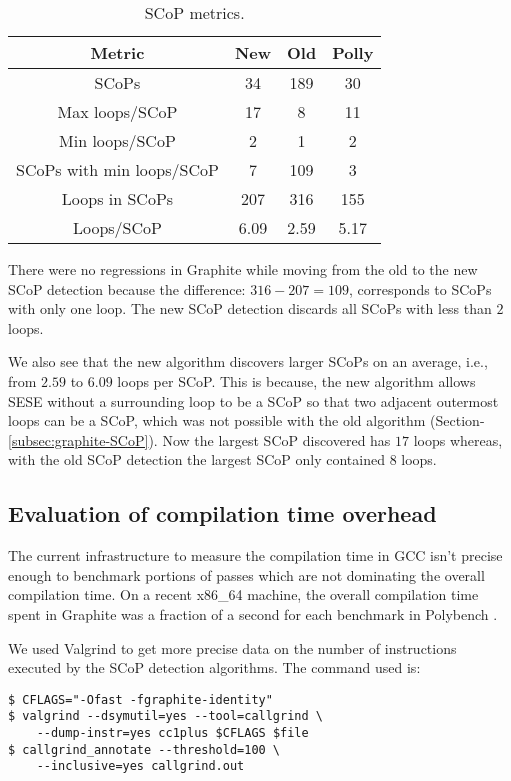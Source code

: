 \documentclass{sig-alternate}
\begin{document}
\begin{table}[h!]
  \begin{center}
    \begin{tabular}{|c|c|c|c|}
      \hline
      Metric                   	& New  & Old  & Polly  \\
      \hline
      SCoPs          		& 34   & 189  & 30     \\
      Max loops/SCoP           	& 17   & 8    & 11     \\
      Min loops/SCoP           	& 2    & 1    & 2      \\
      SCoPs with min loops/SCoP & 7    & 109  & 3      \\
      Loops in SCoPs 		& 207  & 316  & 155    \\
      Loops/SCoP               	& 6.09 & 2.59 & 5.17   \\
      \hline
    \end{tabular}
  \end{center}
  \caption{SCoP metrics.}
  \label{tab:scop-metrics}
\end{table}

There were no regressions in Graphite while moving from the old to the new SCoP
detection because the difference: $316 - 207 = 109$, corresponds
to SCoPs with only one loop.  The new SCoP
detection discards all SCoPs with less than $2$ loops.

We also see that the new algorithm discovers larger SCoPs on an average,
i.e., from $2.59$ to $6.09$ loops per SCoP. This is because, the new
algorithm allows SESE without a surrounding loop to be a SCoP so that two
adjacent outermost loops can be a SCoP, which was not possible with the old algorithm
(Section-\ref{subsec:graphite-SCoP}). Now the largest SCoP discovered has $17$
loops whereas, with the old SCoP detection the largest SCoP only contained $8$ loops.

\subsection{Evaluation of compilation time overhead}
The current infrastructure to measure the compilation time in GCC isn't precise
enough to benchmark portions of passes which are not dominating the overall
compilation time.  On a recent x86\_64 machine, the overall compilation time
spent in Graphite was a fraction of a second for each benchmark
in Polybench \cite{polybench}.

We used Valgrind to get more precise data on the number of instructions executed
by the SCoP detection algorithms.  The command used is:
\begin{verbatim}
$ CFLAGS="-Ofast -fgraphite-identity"
$ valgrind --dsymutil=yes --tool=callgrind \
    --dump-instr=yes cc1plus $CFLAGS $file
$ callgrind_annotate --threshold=100 \
    --inclusive=yes callgrind.out
\end{verbatim}
\end{document}
